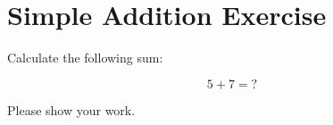 \documentclass{article}
\begin{document}
\section*{Simple Addition Exercise}

Calculate the following sum:

$$5 + 7 = ?$$

Please show your work.
\end{document}
